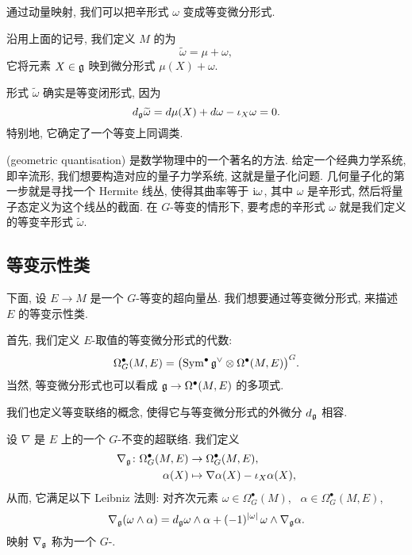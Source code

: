 通过动量映射, 我们可以把辛形式 $\omega$ 变成等变微分形式.

\begin{definition} \label{def-11-equivar-symp-form}
    沿用上面的记号, 我们定义 $M$ 的为
    \[ \widetilde{\omega} = \mu + \omega, \]
    它将元素 $X \in \mathfrak{g}$ 映到微分形式 $\mu (X) + \omega$.
\end{definition}

形式 $\widetilde{\omega}$ 确实是等变闭形式, 因为
\[ d_{\mathfrak{g}} \widetilde{\omega}
    = d \mu (X) + d \omega - \iota_X \omega = 0. \]
特别地, 它确定了一个等变上同调类.

\begin{remark} \label{rmk-11-geo-quant}
     (geometric quantisation) 是数学物理中的一个著名的方法.
    给定一个经典力学系统, 即辛流形, 我们想要构造对应的量子力学系统,
    这就是量子化问题.
    几何量子化的第一步就是寻找一个 Hermite 线丛, 使得其曲率等于 $\mathrm{i} \omega$,
    其中 $\omega$ 是辛形式, 然后将量子态定义为这个线丛的截面.
    在 $G$-等变的情形下,
    要考虑的辛形式 $\omega$ 就是我们定义的等变辛形式 $\widetilde{\omega}$. \varqed
\end{remark}


\subsection{等变示性类}

下面, 设 $E \to M$ 是一个 $G$-等变的超向量丛.
我们想要通过等变微分形式, 来描述 $E$ 的等变示性类.

首先, 我们定义 $E$-取值的等变微分形式的代数:
\[ \Omega_G^\bullet (M, E) = \bigl( \operatorname{Sym}^\bullet \mathfrak{g}^\vee \otimes 
    \Omega^\bullet (M, E) \bigr)^G . \]
当然, 等变微分形式也可以看成 $\mathfrak{g} \to \Omega^\bullet (M, E)$ 的多项式.

我们也定义等变联络的概念, 使得它与等变微分形式的外微分 $d_{\mathfrak{g}}$ 相容.

\begin{definition}
    设 $\nabla$ 是 $E$ 上的一个 $G$-不变的超联络. 我们定义
    \begin{align*}
        \nabla_{\mathfrak{g}} \colon \Omega_G^\bullet (M, E) &\to \Omega_G^\bullet (M, E), \\
        \alpha (X) &\mapsto \nabla \alpha (X) - \iota_X \alpha (X),
    \end{align*}
    从而, 它满足以下 Leibniz 法则: 对齐次元素
    $\omega \in \Omega_G^\bullet (M)$, \ $\alpha \in \Omega_G^\bullet (M, E)$,
    \[ \nabla_{\mathfrak{g}} (\omega \wedge \alpha)
        = d_{\mathfrak{g}} \omega \wedge \alpha
        + (-1)^{|\omega|} \, \omega \wedge \nabla_{\mathfrak{g}} \alpha. \]
    映射 $\nabla_{\mathfrak{g}}$ 称为一个 $G$-.
\end{definition}


